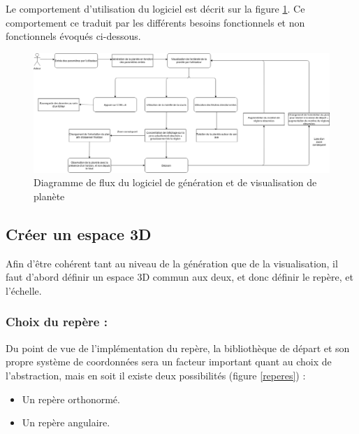 \documentclass[a4paper]{article}
\begin{document}
Le comportement d'utilisation du logiciel est décrit sur la figure \ref{diagrammeflux}. Ce comportement ce traduit par les différents besoins fonctionnels et non fonctionnels évoqués ci-dessous.
\begin{figure}[!h]
\begin{center}\includegraphics[scale=0.3]{img/diagramme_de_flux.png} \end{center}
\caption{Diagramme de flux du logiciel de génération et de visualisation de planète}
\label{diagrammeflux}
\end{figure}

\subsection{Créer un espace 3D}
            Afin d'être cohérent tant au niveau de la génération que de la visualisation, il faut d'abord définir un espace 3D commun aux deux, et donc définir le repère, et l'échelle.
            
            \subsubsection {Choix du repère :}
            Du point de vue de l'implémentation du repère, la bibliothèque de départ et son propre système de coordonnées sera un facteur important quant au choix de l'abstraction, mais en soit il existe deux possibilités (figure \ref{reperes}) :
            \begin{itemize}
                \item Un repère orthonormé.
                \item Un repère angulaire.
            \end{itemize}
            
\end{document}

